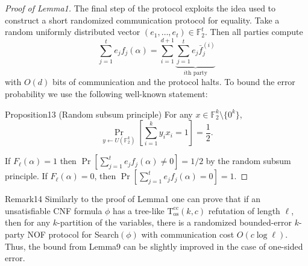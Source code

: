 \begin{proof}[Proof of Lemma1]
The final step of the protocol exploits the idea used to construct a short randomized communication protocol for equality. Take a random uniformly distributed vector $(e_1,\ldots,e_t)\in\mathbb F_2^t$. Then all parties compute
\[\sum_{j=1}^te_jf_j(\alpha)=\sum_{i=1}^{d+1}\underbrace{\sum_{j=1}^te_j\bar f_j^{(i)}}_{i\text{th party}}\]
with $O(d)$ bits of communication and the protocol halts. To bound the error probability we use the following well-known statement:
\begin{authorclaim}{Proposition13 (Random subsum principle)}
For any $x\in\mathbb F_2^k\setminus\{0^k\}$,
\[\Pr_{y\leftarrow U(\mathbb F_2^k)}\left[\sum_{i=1}^ky_ix_i=1\right]=\frac12.\]
\end{authorclaim}
If $F_\ell(\alpha)=1$ then $\Pr[\sum_{j=1}^te_jf_j(\alpha)\ne0]=1/2$ by the random subsum principle. If $F_\ell(\alpha)=0$, then $\Pr[\sum_{j=1}^te_jf_j(\alpha)=0]=1$.
\end{proof}
\begin{authorclaim}{Remark14}
Similarly to the proof of Lemma1 one can prove that if an unsatisfiable CNF formula $\phi$ has a tree-like $\mathrm T^{\mathrm{cc}}_{\mathrm{os}}(k,c)$ refutation of length $\ell$, then for any $k$-partition of the variables, there is a randomized bounded-error $k$-party NOF protocol for Search$(\phi)$ with communication cost $O(c\log\ell)$. Thus, the bound from Lemma9 can be slightly improved in the case of one-sided error.
\end{authorclaim}
